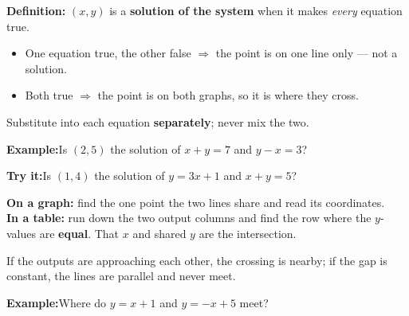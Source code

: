 \documentclass[12pt]{article}
\begin{document}


\begin{formulabox}
\textbf{Definition:} $(x, y)$ is a \textbf{solution of the system} when it makes
\emph{every} equation true.
\begin{itemize}[leftmargin=0.8cm, itemsep=0pt, topsep=2pt]
  \item One equation true, the other false $\Rightarrow$ the point is on one line only --- not a solution.
  \item Both true $\Rightarrow$ the point is on both graphs, so it is where they cross.
\end{itemize}
Substitute into each equation \textbf{separately}; never mix the two.
\end{formulabox}

\begin{examplebox}
\textbf{Example:}\quad Is $(2, 5)$ the solution of $x + y = 7$ and $y - x = 3$?
\end{examplebox}

\begin{tryitbox}
\textbf{Try it:}\quad Is $(1, 4)$ the solution of $y = 3x + 1$ and $x + y = 5$?\\[2pt]
\end{tryitbox}


\begin{formulabox}
\textbf{On a graph:} find the one point the two lines share and read its coordinates.\\[2pt]
\textbf{In a table:} run down the two output columns and find the row where the
$y$-values are \textbf{equal}. That $x$ and shared $y$ are the intersection.\par
If the outputs are approaching each other, the crossing is nearby; if the gap is
constant, the lines are parallel and never meet.
\end{formulabox}

\begin{examplebox}
\textbf{Example:}\quad Where do $y = x + 1$ and $y = -x + 5$ meet?
\end{examplebox}
\end{document}
